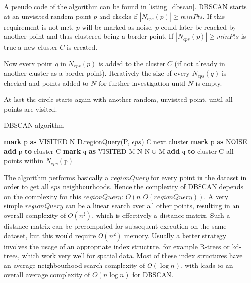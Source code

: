 A pseudo code of the algorithm can be found in listing~\ref{dbscan}. DBSCAN starts at an unvisited random point $p$ and checks if $|N_{eps}(p)| \geq minPts$. If this requirement is not met, $p$ will be marked as noise. $p$ could later be reached by another point and thus clustered being a border point. If $|N_{eps}(p)| \geq minPts$ is true a new cluster $C$ is created. 

Now every point $q$ in $N_{eps}(p)$ is added to the cluster $C$ (if not already in another cluster as a border point). Iteratively the size of every $N_{eps}(q)$ is checked and points added to $N$ for further investigation until $N$ is empty.

At last the circle starts again with another random, unvisited point, until all points are visited.

\begin{algorithm}[tb]
\caption{DBSCAN algorithm}\label{dbscan}
\begin{algorithmic}[1]
	\State \textbf{mark} p \textbf{as} VISITED
	\State N \gets D.regionQuery(P, $eps$)
		\State C \gets next cluster
		\State {}
	\Else		
		\State \textbf{mark} p \textbf{as} NOISE
	\EndIf
\EndFor
\EndFunction
\Statex
{}
\State \textbf{add} p \textbf{to} cluster C
	\State \textbf{mark} q \textbf{as} VISITED
	\State M \gets {}
		\State N \gets N $\cup$ M
	\EndIf
		\State \textbf{add} q \textbf{to} cluster C
	\EndIf
\EndFor
\EndFunction
\Statex
{}
\State \Return all points within $N_{eps}(\text{p})$
\EndFunction
\end{algorithmic}
\end{algorithm}

The algorithm performs basically a $regionQuery$ for every point in the dataset in order to get all $eps$ neighbourhoods. Hence the complexity of DBSCAN depends on the complexity for this $regionQuery$: $O(n \, \, O(regionQuery))$. A very simple $regionQuery$ can be a linear search over all other points, resulting in an overall complexity of $O(n^2)$, which is effectively a distance matrix. Such a distance matrix can be precomputed for subsequent execution on the same dataset, but this would require $O(n^2)$ memory. Usually a better strategy involves the usage of an appropriate index structure, for example R-trees or kd-trees, which work very well for spatial data. Most of these index structures have an average neighbourhood search complexity of $O(\log n)$, with leads to an overall average complexity of $O(n \log n)$ for DBSCAN.

